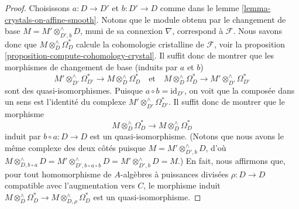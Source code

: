 \begin{proof}
Choisissons $a : D \to D'$ et $b : D' \to D$ comme dans le
lemme \ref{lemma-crystals-on-affine-smooth}.
Notons que le module obtenu par le changement de base $M = M' \otimes^\wedge_{D', b} D$, muni de sa
connexion $\nabla$, correspond à $\mathcal{F}$. Nous savons donc
que $M \otimes^\wedge_D \Omega_D^*$ calcule la cohomologie cristalline
de $\mathcal{F}$, voir la
proposition \ref{proposition-compute-cohomology-crystal}.
Il suffit donc de montrer que les morphismes de changement de base (induits
par $a$ et $b$)
$$
M' \otimes^\wedge_{D'} \Omega^*_{D'}
\longrightarrow
M \otimes^\wedge_D \Omega^*_D
\quad\text{et}\quad
M \otimes^\wedge_D \Omega^*_D
\longrightarrow
M' \otimes^\wedge_{D'} \Omega^*_{D'}
$$
sont des quasi-isomorphismes. Puisque $a \circ b = \text{id}_{D'}$, on voit
que la composée dans un sens est l'identité du complexe
$M' \otimes^\wedge_{D'} \Omega^*_{D'}$. Il suffit donc de montrer que
le morphisme
$$
M \otimes^\wedge_D \Omega^*_D
\longrightarrow
M \otimes^\wedge_D \Omega^*_D
$$
induit par $b \circ a : D \to D$ est un quasi-isomorphisme. (Notons que nous
avons le même complexe des deux côtés puisque $M = M' \otimes^\wedge_{D', b} D$,
d'où $M \otimes^\wedge_{D, b \circ a} D =
M' \otimes^\wedge_{D', b \circ a \circ b} D =
M' \otimes^\wedge_{D', b} D = M$.) En fait, nous affirmons que, pour tout
homomorphisme de $A$-algèbres à puissances divisées $\rho : D \to D$ compatible
avec l'augmentation vers $C$, le morphisme induit
$M \otimes^\wedge_D \Omega^*_D \to M \otimes^\wedge_{D, \rho} \Omega^*_D$
est un quasi-isomorphisme.


\end{proof}
